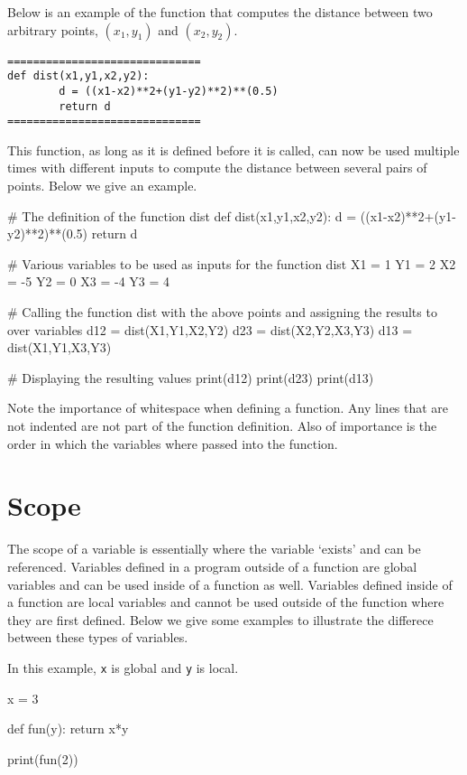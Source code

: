 \documentclass{ximera}
\begin{document}
Below is an example of the function that computes the distance between two arbitrary points, $(x_1,y_1)$ and $(x_2,y_2)$.

\begin{verbatim}
==============================
def dist(x1,y1,x2,y2):
        d = ((x1-x2)**2+(y1-y2)**2)**(0.5)
        return d
==============================
\end{verbatim}

This function, as long as it is defined before it is called, can now be used multiple times with different inputs to compute the distance between several pairs of points. Below we give an example.

\begin{sageCell}
# The definition of the function dist	
def dist(x1,y1,x2,y2):
        d = ((x1-x2)**2+(y1-y2)**2)**(0.5)
        return d

# Various variables to be used as inputs for the function dist
X1 = 1
Y1 = 2
X2 = -5
Y2 = 0
X3 = -4
Y3 = 4

# Calling the function dist with the above points and assigning the results to over variables
d12 = dist(X1,Y1,X2,Y2)
d23 = dist(X2,Y2,X3,Y3)
d13 = dist(X1,Y1,X3,Y3)
	
# Displaying the resulting values
print(d12)
print(d23)
print(d13)
\end{sageCell}

Note the importance of whitespace when defining a function. Any lines that are not indented are not part of the function definition. Also of importance is the order in which the variables where passed into the function.

\section{Scope}

The scope of a variable is essentially where the variable `exists' and can be referenced. Variables defined in a program outside of a function are global variables and can be used inside of a function as well. Variables defined inside of a function are local variables and cannot be used outside of the function where they are first defined. Below we give some examples to illustrate the differece between these types of variables.

In this example, \verb|x| is global and \verb|y| is local.

\begin{sageCell}
x = 3

def fun(y):
        return x*y

print(fun(2))
\end{sageCell}
\end{document}

